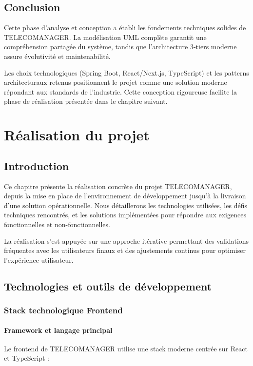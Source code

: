 \documentclass[12pt,a4paper]{report}
\begin{document}
\section{Conclusion}
Cette phase d'analyse et conception a établi les fondements techniques solides de TELECOMANAGER. La modélisation UML complète garantit une compréhension partagée du système, tandis que l'architecture 3-tiers moderne assure évolutivité et maintenabilité.

Les choix technologiques (Spring Boot, React/Next.js, TypeScript) et les patterns architecturaux retenus positionnent le projet comme une solution moderne répondant aux standards de l'industrie. Cette conception rigoureuse facilite la phase de réalisation présentée dans le chapitre suivant.
\chapter{Réalisation du projet}

\section{Introduction}
Ce chapitre présente la réalisation concrète du projet TELECOMANAGER, depuis la mise en place de l'environnement de développement jusqu'à la livraison d'une solution opérationnelle. Nous détaillerons les technologies utilisées, les défis techniques rencontrés, et les solutions implémentées pour répondre aux exigences fonctionnelles et non-fonctionnelles.

La réalisation s'est appuyée sur une approche itérative permettant des validations fréquentes avec les utilisateurs finaux et des ajustements continus pour optimiser l'expérience utilisateur.

\section{Technologies et outils de développement}

\subsection{Stack technologique Frontend}

\subsubsection{Framework et langage principal}
Le frontend de TELECOMANAGER utilise une stack moderne centrée sur React et TypeScript :
\end{document}
